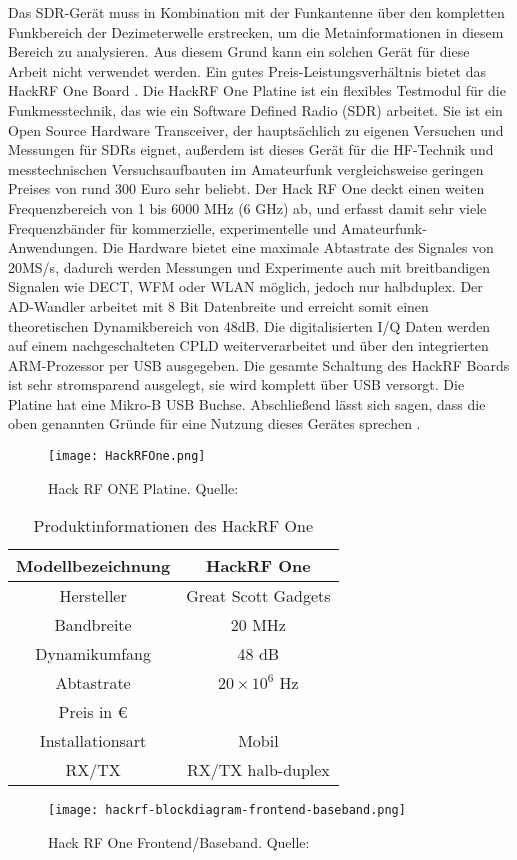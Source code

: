 Das SDR-Gerät muss in Kombination mit der Funkantenne über den kompletten Funkbereich der Dezimeterwelle erstrecken, um die Metainformationen in diesem Bereich zu analysieren. Aus diesem Grund kann ein solchen Gerät für diese Arbeit nicht verwendet werden.
Ein gutes Preis-Leistungsverhältnis bietet das HackRF One Board \cite{greatscott}. Die HackRF One Platine ist ein flexibles Testmodul für die Funkmesstechnik, das wie ein Software Defined Radio (SDR) arbeitet. Sie ist ein Open Source Hardware Transceiver, der hauptsächlich zu eigenen Versuchen und Messungen für SDRs eignet, außerdem ist dieses Gerät für die HF-Technik und messtechnischen Versuchsaufbauten im Amateurfunk vergleichsweise geringen Preises von rund 300 Euro sehr beliebt.
Der Hack RF One deckt einen weiten Frequenzbereich von 1 bis 6000 MHz (6 GHz) ab, und erfasst damit sehr viele Frequenzbänder für kommerzielle, experimentelle und Amateurfunk-Anwendungen. Die Hardware bietet eine maximale Abtastrate des Signales von 20MS/s, dadurch werden Messungen und Experimente auch mit breitbandigen Signalen wie DECT, WFM oder WLAN möglich, jedoch nur halbduplex. Der AD-Wandler arbeitet mit 8 Bit Datenbreite und erreicht somit einen theoretischen Dynamikbereich von 48dB. Die digitalisierten I/Q Daten werden auf einem nachgeschalteten CPLD weiterverarbeitet und über den integrierten ARM-Prozessor per USB ausgegeben. Die gesamte Schaltung des HackRF Boards ist sehr stromsparend ausgelegt, sie wird komplett über USB versorgt. Die Platine hat eine Mikro-B USB Buchse. Abschließend lässt sich sagen, dass die oben genannten Gründe für eine Nutzung dieses Gerätes sprechen \cite{wimo:2018}.


\begin{figure}[ht]
	\centering
	\texttt{[image: HackRFOne.png]}
	\caption[Hack RF ONE Platine]{Hack RF ONE Platine. Quelle: \cite{HackRFOne:2018}} 
	\label{HackRFOne}
\end{figure}


\begin{table}[ht]
	\centering
	\begin{tabular}{c|c}
		Modellbezeichnung & HackRF One \\
		\hline
		Hersteller & Great Scott Gadgets\\ 
		\hline 
		Bandbreite & 20 MHz \\ 
		\hline 
		Dynamikumfang & 48 dB \\ %
		\hline 
		Abtastrate & \( 20 \times 10^{6} \) Hz \\ 
		\hline 
		Preis in \euro &  \\ 
		\hline 
		Installationsart & Mobil \\ 
		\hline 
		RX/TX & RX/TX halb-duplex \\ 
	\end{tabular} 
	\caption{Produktinformationen des HackRF One}
\end{table}


\begin{figure}[ht]
	\centering
	\texttt{[image: hackrf-blockdiagram-frontend-baseband.png]}
	\caption[Hack RF One Frontend/Baseband]{Hack RF One Frontend/Baseband. Quelle: \cite{hackrf-wiki:2016}} 
	\label{HackRFOne-Blockschaltbild}
\end{figure}
